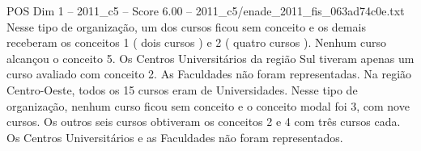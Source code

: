 \begin{textsample}{POS Dim 1 – 2011\_c5 – Score 6.00 – 2011\_c5/enade\_2011\_fis\_063ad74c0e.txt}
Nesse tipo de organização, um dos cursos ficou sem conceito e os demais receberam os conceitos 1 ( dois cursos ) e 2 ( quatro cursos ).
Nenhum curso alcançou o conceito 5.
Os Centros Universitários da região Sul tiveram apenas um curso avaliado com conceito 2.
As Faculdades não foram representadas.
Na região Centro-Oeste, todos os 15 cursos eram de Universidades.
Nesse tipo de organização, nenhum curso ficou sem conceito e o conceito modal foi 3, com nove cursos.
Os outros seis cursos obtiveram os conceitos 2 e 4 com três cursos cada.
Os Centros Universitários e as Faculdades não foram representados.

\end{textsample}

